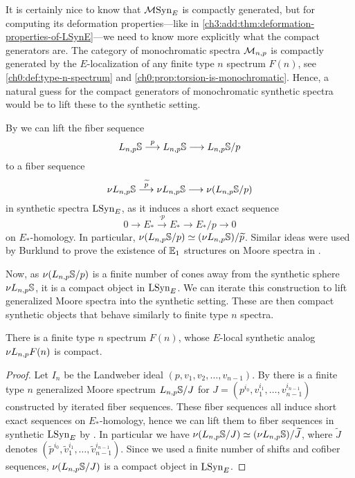 It is certainly nice to know that $\mathcal{M}\mathrm{Syn}_{E}$ is compactly generated, but for computing its deformation properties---like in \cref{ch3:add:thm:deformation-properties-of-LSynE}---we need to know more explicitly what the compact generators are. The category of monochromatic spectra $\mathcal{M}_{n,p}$ is compactly generated by the $E$-localization of any finite type $n$ spectrum $F(n)$, see \cref{ch0:def:type-n-spectrum} and \cref{ch0:prop:torsion-is-monochromatic}. Hence, a natural guess for the compact generators of monochromatic synthetic spectra would be to lift these to the synthetic setting. 

\begin{construction}
    By \cite[4.23]{pstragowski_2022} we can lift the fiber sequence 
    \[L_{n,p}\mathbb{S}\overset{p}{\longrightarrow} L_{n,p}\mathbb{S}\longrightarrow L_{n,p}\mathbb{S}/p\] 
    to a fiber sequence 
    \[\nu L_{n,p}\mathbb{S} \overset{\widetilde{p}}{\longrightarrow} \nu L_{n,p}\mathbb{S}\longrightarrow \nu (L_{n,p}\mathbb{S}/p)\] 
    in synthetic spectra $\mathrm{LSyn}_{E}$, as it induces a short exact sequence 
    \[0\to E_{*} \overset{\cdot p}\to E_{*}\to E_{*}/p\to 0\]
    on $E_{*}$-homology. In particular, $\nu (L_{n,p}\mathbb{S}/p)\simeq (\nu L_{n,p}\mathbb{S})/\widetilde{p}$. Similar ideas were used by Burklund to prove the existence of $\mathbb{E}_1$ structures on Moore spectra in \cite{burklund_2022}. 
    
    Now, as $\nu (L_{n,p}\mathbb{S}/p)$ is a finite number of cones away from the synthetic sphere $\nu L_{n,p} \mathbb{S}$, it is a compact object in $\mathrm{LSyn}_{E}$. We can iterate this construction to lift generalized Moore spectra into the synthetic setting. These are then compact synthetic objects that behave similarly to finite type $n$ spectra. 
\end{construction}

\begin{lemma}
    There is a finite type $n$ spectrum $F(n)$, whose $E$-local synthetic analog $\nu L_{n,p} F(n)$ is compact. 
\end{lemma}
\begin{proof}
    Let $I_n$ be the Landweber ideal $(p,v_1, v_2, \ldots, v_{n-1})$. By \cite[4.14]{hovey-strickland_99} there is a finite type $n$ generalized Moore spectrum $L_{n,p}\mathbb{S}/J$ for $J=(p^{i_0}, v_1^{i_1}, \ldots, v_{n-1}^{i_{n-1}})$ constructed by iterated fiber sequences. These fiber sequences all induce short exact sequences on $E_{*}$-homology, hence we can lift them to fiber sequences in synthetic $\mathrm{LSyn}_{E}$ by \cite[4.23]{pstragowski_2022}. In particular we have $\nu (L_{n,p}\mathbb{S}/J) \simeq (\nu L_{n,p}\mathbb{S})/\widetilde{J}$, where $\widetilde{J}$ denotes $(\widetilde{p}^{i_0}, \widetilde{v}_1^{i_1}, \ldots, \widetilde{v}_{n-1}^{i_{n-1}})$. Since we used a finite number of shifts and cofiber sequences, $\nu (L_{n,p}\mathbb{S}/J)$ is a compact object in $\mathrm{LSyn}_{E}$. 
\end{proof}

